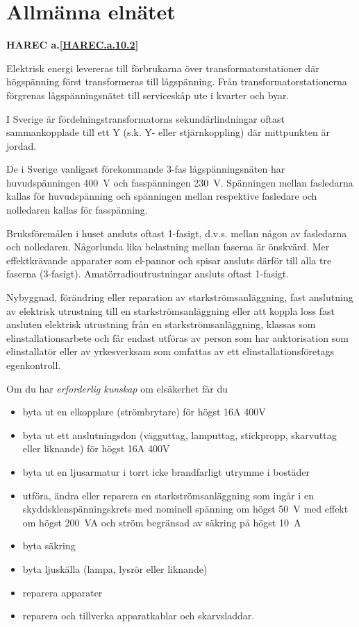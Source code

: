 \section{Allmänna elnätet}
\textbf{
HAREC a.\ref{HAREC.a.10.2}\label{myHAREC.a.10.2}
}
\label{jordning}

Elektrisk energi levereras till förbrukarna över transformatorstationer där
högspänning först transformeras till lågspänning.
Från transformatorstationerna förgrenas lågspänningsnätet till serviceskåp ute
i kvarter och byar.

I Sverige är fördelningstransformatorns sekundärlindningar oftast sammankopplade
till ett Y (s.k. Y- eller stjärnkoppling) där mittpunkten är jordad.

De i Sverige vanligast förekommande 3-fas lågspänningsnäten har huvudspänningen
400~V och fasspänningen 230~V.
Spänningen mellan fasledarna kallas för huvudspänning och spänningen mellan
respektive fasledare och nolledaren kallas för fasspänning.

Bruksföremålen i huset ansluts oftast 1-fasigt, d.v.s. mellan någon av
fasledarna och nolledaren.
Någorlunda lika belastning mellan faserna är önskvärd.
Mer effektkrävande apparater som el-pannor och spisar ansluts därför till alla
tre faserna (3-fasigt).
Amatörradioutrustningar ansluts oftast 1-fasigt.

Nybyggnad, förändring eller reparation av starkströmsanläggning,
fast anslutning av elektrisk utrustning till en starkströmsanläggning
eller att koppla loss fast ansluten elektrisk utrustning från en
starkströmsanläggning, klassas som elinstallationsarbete och får endast
utföras av person som har auktorisation som elinstallatör eller av
yrkesverksam som omfattas av ett elinstallationsföretags egenkontroll.

Om du har \emph{erforderlig kunskap} om elsäkerhet får du
\begin{itemize}
\item byta ut en elkopplare (strömbrytare) för högst 16A 400V
\item byta ut ett anslutningsdon (vägguttag, lamputtag, stickpropp,
skarvuttag eller liknande) för högst 16A 400V
\item byta ut en ljusarmatur i torrt icke brandfarligt utrymme i bostäder
\item utföra, ändra eller reparera en starkströmsanläggning som ingår i en
skyddsklenspänningskrets med nominell spänning om högst 50~V med effekt om
högst 200~VA och ström begränsad av säkring på högst 10~A
\item byta säkring
\item byta ljuskälla (lampa, lysrör eller liknande)
\item reparera apparater
\item reparera och tillverka apparatkablar och skarvsladdar.
\end{itemize}

